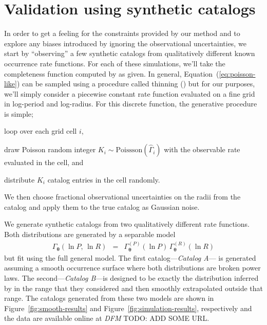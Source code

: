 \documentclass[12pt,preprint]{aastex}
\newcommand{\figref}[1]{\ref{fig:#1}}
\newcommand{\Fig}[1]{Figure~\figref{#1}}
\newcommand{\fig}[1]{\Fig{#1}}
\newcommand{\Eq}[1]{Equation~(\ref{eq:#1})}
\newcommand{\eq}[1]{\Eq{#1}}
\newcommand{\sectlabel}[1]{\label{sect:#1}}
\newcommand{\bvec}[1]{\ensuremath{\boldsymbol{#1}}}
\newcommand{\todo}[3]{{\color{#2} \emph{#1} TODO: #3}}
\newcommand{\dfmtodo}[1]{\todo{DFM}{red}{#1}}
\newcommand{\rate}{\ensuremath{\Gamma}}
\newcommand{\ratepar}{{\ensuremath{\theta}}}
\newcommand{\ratepars}{{\ensuremath{\bvec{\ratepar}}}}
\newcommand{\obs}[1]{\ensuremath{\hat{#1}}}
\newcommand{\radius}{\ensuremath{R}}
\newcommand{\period}{\ensuremath{P}}
\newcommand{\modela}{\emph{Catalog A}}
\newcommand{\modelb}{\emph{Catalog B}}
\begin{document}
\section{Validation using synthetic catalogs}
\sectlabel{valid}

In order to get a feeling for the constraints provided by our method and to
explore any biases introduced by ignoring the observational uncertainties, we
start by ``observing'' a few synthetic catalogs from qualitatively different
known occurrence rate functions.
For each of these simulations, we'll take the completeness function computed
by \citet{petigura} as given.
In general, \eq{poisson-like} can be sampled using a procedure called thinning
(\citealt{poisson}) but for our purposes, we'll simply consider a piecewise
constant rate function evaluated on a fine grid in log-period and log-radius.
For this discrete function, the generative procedure is simple;
\begin{enumerate}
{\item loop over each grid cell $i$,}
{\item draw Poisson random integer $K_i\sim\mathrm{Poissson}(\obs{\rate}_i)$
with the observable rate evaluated in the cell, and}
{\item distribute $K_i$ catalog entries in the cell randomly.}
\end{enumerate}
We then choose fractional observational uncertainties on the radii from the
\citet{petigura} catalog and apply them to the true catalog as Gaussian noise.

We generate synthetic catalogs from two qualitatively different rate
functions.
Both distributions are generated by a separable model
\begin{eqnarray}
\rate_\ratepars (\ln\period,\,\ln\radius) &=&
    \rate_\ratepars^{(\period)}(\ln\period)\,
    \rate_\ratepars^{(\radius)}(\ln\radius)
\end{eqnarray}
but fit using the full general model.
The first catalog---\modela--- is generated assuming a smooth occurrence
surface where both distributions are broken power laws.
The second---\modelb---is designed to be exactly the distribution inferred by
\citet{petigura} in the range that they considered and then smoothly
extrapolated outside that range.
The catalogs generated from these two models are shown in \fig{smooth-results}
and \fig{simulation-results}, respectively and the data are available online
at \dfmtodo{ADD SOME URL}.
\end{document}
